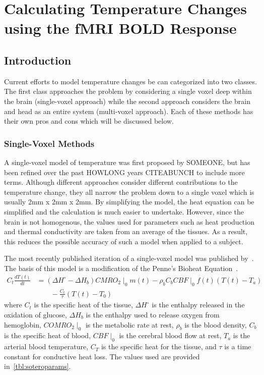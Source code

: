 \chapter{Calculating Temperature Changes using the fMRI BOLD Response}
    
  \section{\label{sec:tempmodelintro} Introduction}
  Current efforts to model temperature changes be can categorized into two classes.  The first class approaches the problem by considering a single voxel deep within the brain (single-voxel approach) while the second approach considers the brain and head as an entire system (multi-voxel approach).  Each of these methods has their own pros and cons which will be discussed below.
    \subsection{\label{sec:singlevox} Single-Voxel Methods}
    A single-voxel model of temperature was first proposed by SOMEONE, but has been refined over the past HOWLONG years CITEABUNCH to include more terms.  Although different approaches consider different contributions to the temperature change, they all narrow the problem down to a single voxel which is usually 2mm x 2mm x 2mm.  By simplifying the model, the heat equation can be simplified and the calculation is much easier to undertake.  However, since the brain is not homogenous, the values used for parameters such as heat production and thermal conductivity are taken from an average of the tissues.  As a result, this reduces the possible accuracy of such a model when applied to a subject.
    
    The most recently published iteration of a single-voxel model was published by~\citet{sotero2011}.  The basis of this model is a modification of the Penne's Bioheat Equation~\citep{pennes, sotero2011}.
    \begin{align}
      \label{eq:bioheat}
      C_t \frac{dT(t)}{dt} &= (\Delta H^{\circ}-\Delta H_{b}) CMRO_{2}\mid_{0} m(t) - \rho_{b} C_{b} CBF\mid_{0} f(t) (T(t) - T_{a}) \nonumber \\
      &\qquad {} - \frac{C_{t}}{\tau} (T(t)-T_{0})
    \end{align}
    where $C_t$ is the specific heat of the tissue, $\Delta H^{\circ}$ is the enthalpy released in the oxidation of glucose, $\Delta H_b$ is the enthalpy used to release oxygen from hemoglobin, $COMRO_2 \mid_0$ is the metabolic rate at rest, $\rho_b$ is the blood density, $C_b$ is the specific heat of blood, $CBF\mid_0$ is the cerebral blood flow at rest, $T_a$ is the arterial blood temperature, $C_T$ is the specific heat for the tissue, and $\tau$ is a time constant for conductive heat loss.  The values used are provided in~\cref{tbl:soteroparams}.
    
